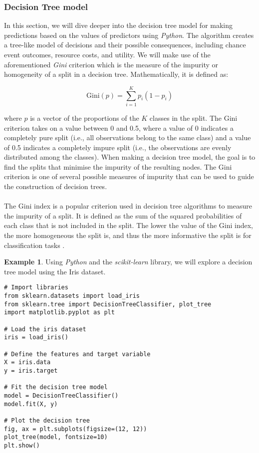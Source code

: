 \documentclass{article}[12pt]
\theoremstyle{definition}
\newtheorem{exmp}{Example}[section]
\begin{document}
\subsubsection{Decision Tree model}

\bigskip

In this section, we will dive deeper into the decision tree model for making predictions based on the values of predictors using \emph{Python}. The algorithm creates a tree-like model of decisions and their possible consequences, including chance event outcomes, resource costs, and utility. We will make use of the aforementioned \emph{Gini} criterion which is the measure of the impurity or homogeneity of a split in a decision tree. Mathematically, it is defined as:

$$\text{Gini}(p) = \sum_{i=1}^{K}p_i(1-p_i)$$

\medskip

\noindent
where $p$ is a vector of the proportions of the $K$ classes in the split. The Gini criterion takes on a value between 0 and 0.5, where a value of 0 indicates a completely pure split (i.e., all observations belong to the same class) and a value of 0.5 indicates a completely impure split (i.e., the observations are evenly distributed among the classes). When making a decision tree model, the goal is to find the splits that minimise the impurity of the resulting nodes. The Gini criterion is one of several possible measures of impurity that can be used to guide the construction of decision trees.
\\
\\
The Gini index is a popular criterion used in decision tree algorithms to measure the impurity of a split. It is defined as the sum of the squared probabilities of each class that is not included in the split. The lower the value of the Gini index, the more homogeneous the split is, and thus the more informative the split is for classification tasks \cite{breiman1984classification}.

\newpage

\bigskip

\begin{exmp}
    Using \emph{Python} and the \emph{scikit-learn} library, we will explore a decision tree model using the Iris dataset.
\end{exmp}

\medskip

\begin{verbatim}
# Import libraries
from sklearn.datasets import load_iris
from sklearn.tree import DecisionTreeClassifier, plot_tree
import matplotlib.pyplot as plt

# Load the iris dataset
iris = load_iris()

# Define the features and target variable
X = iris.data
y = iris.target

# Fit the decision tree model
model = DecisionTreeClassifier()
model.fit(X, y)

# Plot the decision tree
fig, ax = plt.subplots(figsize=(12, 12))
plot_tree(model, fontsize=10)
plt.show()
\end{verbatim}
\end{document}
